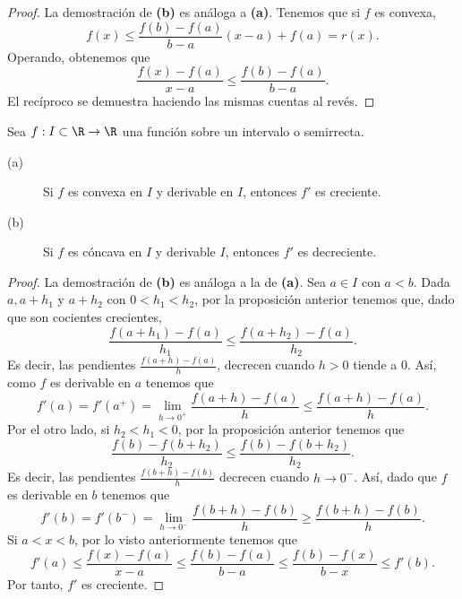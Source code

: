 \begin{proof}
La demostración de \textbf{(b)} es análoga a \textbf{(a)}. Tenemos que si $\displaystyle f $ es convexa, 
\[ f\left(x\right) \leq \frac{f\left(b\right)-f\left(a\right)}{b-a}\left(x-a\right) + f\left(a\right) = r\left(x\right) .\]
Operando, obtenemos que 
\[\frac{f\left(x\right)-f\left(a\right)}{x-a} \leq \frac{f\left(b\right)-f\left(a\right)}{b-a} .\]
El recíproco se demuestra haciendo las mismas cuentas al revés.
\end{proof}
\begin{fprop}[]
\normalfont Sea $\displaystyle f : I \subset \R \to \R $ una función sobre un intervalo o semirrecta.
\begin{description}
\item[(a)] Si $\displaystyle f $ es convexa en $\displaystyle I $ y derivable en $\displaystyle I $, entonces $\displaystyle f' $ es creciente.
\item[(b)] Si $\displaystyle f $ es cóncava en $\displaystyle I $ y derivable $\displaystyle I $, entonces $\displaystyle f' $ es decreciente.
\end{description}
\end{fprop}
\begin{proof}
La demostración de \textbf{(b)} es análoga a la de \textbf{(a)}. Sea $\displaystyle a \in I $ con $\displaystyle a < b $. Dada $\displaystyle a, a + h_{1} $ y $\displaystyle a + h_{2} $ con $\displaystyle 0 < h_{1} < h_{2} $, por la proposición anterior tenemos que, dado que son cocientes crecientes,
\[  \frac{f\left(a + h_{1}\right)-f\left(a\right)}{h_{1}} \leq \frac{f\left(a + h_{2}\right)-f\left(a\right)}{h_{2}} .\]
Es decir, las pendientes $\displaystyle \frac{f\left(a+h\right)-f\left(a\right)}{h} $, decrecen cuando $\displaystyle h > 0 $ tiende a $\displaystyle 0 $. Así, como $\displaystyle f $ es derivable en $\displaystyle a $ tenemos que
\[ f'\left(a\right) = f'\left(a^{+}\right) =\lim_{h \to 0^{+}}\frac{f\left(a+h\right)-f\left(a\right)}{h} \leq \frac{f\left(a+h\right)-f\left(a\right)}{h} .\]
Por el otro lado, si $\displaystyle h_{2} < h_{1} < 0 $, por la proposición anterior tenemos que 
\[ \frac{f\left(b\right)-f\left(b + h_{2}\right)}{h_{2}} \leq \frac{f\left(b\right)-f\left(b+h_{2}\right)}{h_{2}}  .\]
Es decir, las pendientes $\displaystyle \frac{f\left(b+h\right)-f\left(b\right)}{h} $ decrecen cuando $\displaystyle h\to 0^{- } $. Así, dado que $\displaystyle f $ es derivable en $\displaystyle b $ tenemos que
\[ f'\left(b\right) = f'\left(b^{-}\right) = \lim_{h \to 0^{-}}\frac{f\left(b+h\right)-f\left(b\right)}{h} \geq \frac{f\left(b+h\right)-f\left(b\right)}{h} .\]
Si $\displaystyle a < x < b $, por lo visto anteriormente tenemos que
\[ f'\left(a\right) \leq \frac{f\left(x\right)-f\left(a\right)}{x-a} \leq \frac{f\left(b\right)-f\left(a\right)}{b-a} \leq \frac{f\left(b\right)-f\left(x\right)}{b-x} \leq f'\left(b\right) .\]
Por tanto, $\displaystyle f' $ es creciente.
\end{proof}
